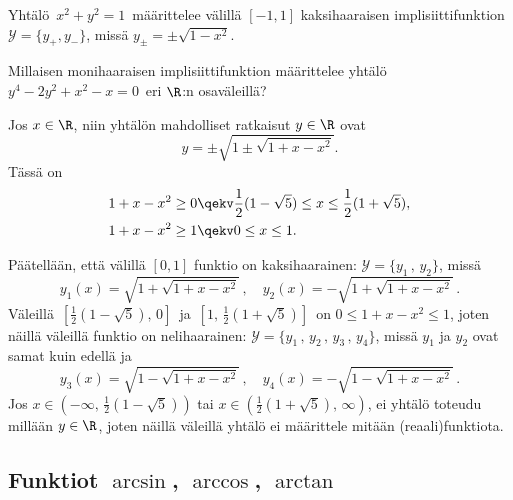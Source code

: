 \begin{Exa}
Yhtälö $\,x^2+y^2=1\,$ määrittelee välillä $[-1,1]$ kaksihaaraisen implisiittifunktion
$\mathcal{Y}=\{y_+,y_-\}$, missä $y_\pm = \pm \sqrt{1-x^2}$. \loppu
\end{Exa}
\begin{Exa} Millaisen monihaaraisen implisiittifunktion määrittelee yhtälö \newline
$y^4-2y^2+x^2-x=0\,$ eri $\R$:n osaväleillä?
\end{Exa}
\ratk Jos $x\in\R$, niin yhtälön mahdolliset ratkaisut $y\in\R$ ovat
\[
y=\pm\sqrt{1\pm\sqrt{1+x-x^2}}.
\]
Tässä on
\begin{align*}
1+x-x^2 &\ge 0 \qekv \frac{1}{2}(1-\sqrt{5}) \le x \le \frac{1}{2}(1+\sqrt{5}), \\
1+x-x^2 &\ge 1 \qekv 0 \le x \le 1.
\end{align*}

Päätellään, että välillä $[0,1]$ funktio on kaksihaarainen: $\mathcal{Y}=\{y_1\,,\,y_2\}$,
missä
\[
y_1(x)=\sqrt{1+\sqrt{1+x-x^2}}\,, \quad y_2(x)=-\sqrt{1+\sqrt{1+x-x^2}}\,.
\]
Väleillä $\,[\tfrac{1}{2}(1-\sqrt{5}),\,0]\,$ ja $\,[1,\,\tfrac{1}{2}(1+\sqrt{5})]\,$ on
$0 \le 1+x-x^2 \le 1$, joten näillä väleillä funktio on nelihaarainen: 
$\mathcal{Y}=\{y_1\,,\,y_2\,,\,y_3\,,\,y_4\}$, missä $y_1$ ja $y_2$ ovat samat kuin edellä ja
\[
y_3(x)=\sqrt{1-\sqrt{1+x-x^2}}\,, \quad  y_4(x)=-\sqrt{1-\sqrt{1+x-x^2}}\,.
\]
Jos $x\in(-\infty,\,\tfrac{1}{2}(1-\sqrt{5}))$ tai $x\in(\tfrac{1}{2}(1+\sqrt{5}),\,\infty)$,
ei yhtälö toteudu millään $y\in\R$, joten näillä väleillä yhtälö ei määrittele mitään
(reaali)funktiota. \loppu 

\subsection*{Funktiot $\arcsin$, $\arccos$, $\arctan$}

